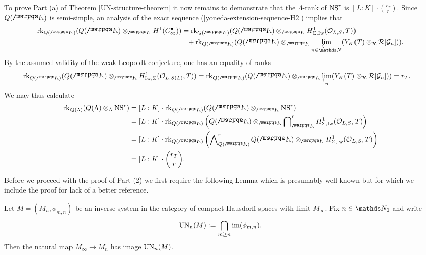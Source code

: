 \documentclass[a4paper, 
headsepline=off, DIV=12, titlepage=false]{scrartcl}
\begin{document}
To prove Part (a) of Theorem \ref{UN-structure-theorem} it now remains to demonstrate that the $\Lambda$-rank of $\mathrm{NS}^{r}$ is $[L:K]\cdot{r_T \choose r}$. 
Since $Q(\bLambda)$ is semi-simple,
an analysis of the exact sequence (\ref{yoneda-extension-sequence-H2}) implies that
\begin{align*}
\rank_{Q(\bLambda)}(Q(\bLambda) \otimes_{\bLambda} H^1(C^\bullet_\infty)) & = 
    \rank_{Q(\bLambda)}(Q(\bLambda) \otimes_{\bLambda} H^1_{ \Sigma, \Iw}(\cO_{L, S}, T))  \\
    & \phantom{=} + \rank_{Q(\bLambda)}(Q(\bLambda) \otimes_{\bLambda} \varprojlim_{n \in \N} (Y_K(T) \otimes_\cR \cR[\cG_n])).
\end{align*}
By the assumed validity of the weak Leopoldt conjecture, one has an equality of ranks
\begin{align*}
    \rank_{Q(\bLambda)}(Q(\bLambda) \otimes_{\bLambda} H^1_{\Iw, \Sigma}(\cO_{L, S(L)}, T)) &= \rank_{Q(\bLambda)}(Q(\bLambda) \otimes_{\bLambda} \varprojlim_n (Y_K(T) \otimes_\cR \cR[\cG_n])) = r_T.
\end{align*}
We may thus calculate
\begin{align*}
    \rank_{Q(\Lambda)}(Q(\Lambda) \otimes_\Lambda \NS^{r}) &= [L:K]\cdot \rank_{Q(\bLambda)}(Q(\bLambda) \otimes_{\bLambda} \NS^{r})\\
    &= [L:K] \cdot \rank_{Q(\bLambda)}\left(Q(\bLambda) \otimes_{\bLambda} \bidual_{\bLambda}^{r} H^1_{\Sigma, \Iw}(\cO_{L, S}, T)\right)\\
    &= [L:K]\cdot \rank_{Q(\bLambda)}\left(\exprod_{Q(\bLambda)}^{r} Q(\bLambda) \otimes_{\bLambda} H^1_{\Sigma, \Iw}(\cO_{L, S}, T)\right)\\
    &= [L:K]\cdot {r_T \choose r}.
\end{align*}

Before we proceed with the proof of Part (2) we first require the following Lemma which is presumably well-known but for which we include the proof for lack of a better reference.

\begin{lemma} \label{compactness-argument}
    Let $M = (M_n, \phi_{m,n})$ be an inverse system in the category of compact Hausdorff spaces with limit $M_\infty$. Fix $n \in \NN_0$ and write
    \begin{align*}
        \mathrm{UN}_n(M) := \bigcap_{m \geq n} \operatorname{im}(\phi_{m,n}).
    \end{align*}
    Then the natural map $M_\infty \to M_n$ has image $\mathrm{UN}_n(M)$.
\end{lemma}
\end{document}
